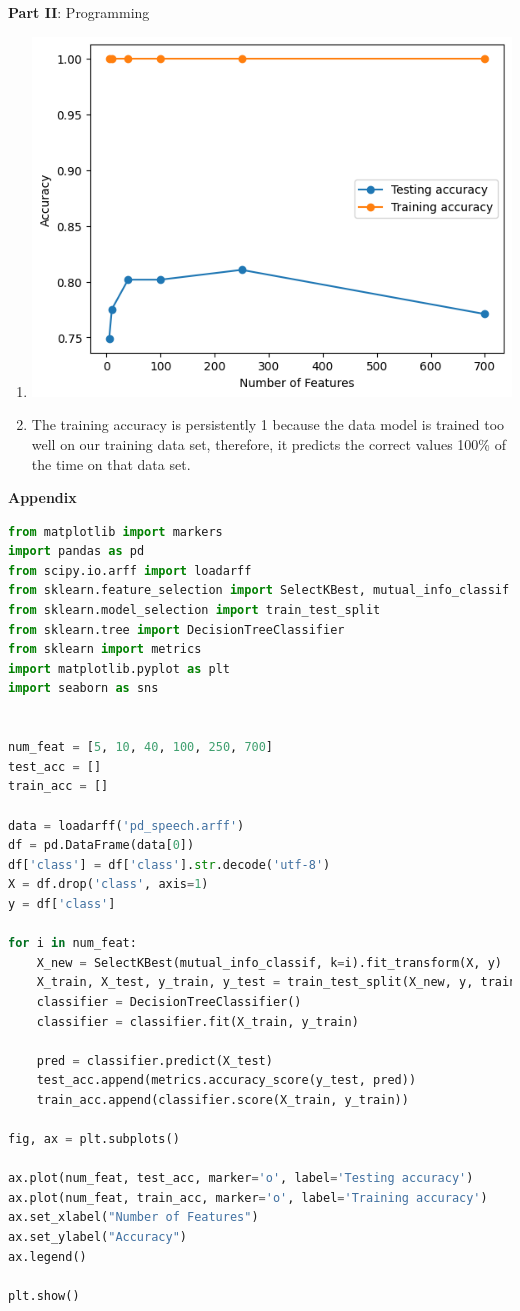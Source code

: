 \documentclass[12pt]{article}
\begin{document}
\center\large{\textbf{Part II}: Programming}

\begin{enumerate}[leftmargin=\labelsep,resume]
\item  \leavevmode\vadjust{\vspace{-\baselineskip}}\newline
\includegraphics{plot}
\item
The training accuracy is persistently 1 because the data model is trained too well on 
our training data set, therefore, it predicts the correct values 100\% of the time on that 
data set.

\end{enumerate}
\newpage
\center\large{\textbf{Appendix}\vskip 0.3cm}

\begin{lstlisting}[language=Python]
from matplotlib import markers
import pandas as pd
from scipy.io.arff import loadarff
from sklearn.feature_selection import SelectKBest, mutual_info_classif
from sklearn.model_selection import train_test_split
from sklearn.tree import DecisionTreeClassifier
from sklearn import metrics
import matplotlib.pyplot as plt
import seaborn as sns


num_feat = [5, 10, 40, 100, 250, 700]
test_acc = []
train_acc = []

data = loadarff('pd_speech.arff')
df = pd.DataFrame(data[0])
df['class'] = df['class'].str.decode('utf-8')
X = df.drop('class', axis=1)
y = df['class']

for i in num_feat:
    X_new = SelectKBest(mutual_info_classif, k=i).fit_transform(X, y)
    X_train, X_test, y_train, y_test = train_test_split(X_new, y, train_size = 0.7,random_state = 1)
    classifier = DecisionTreeClassifier()
    classifier = classifier.fit(X_train, y_train)

    pred = classifier.predict(X_test)
    test_acc.append(metrics.accuracy_score(y_test, pred))
    train_acc.append(classifier.score(X_train, y_train))

fig, ax = plt.subplots()

ax.plot(num_feat, test_acc, marker='o', label='Testing accuracy')
ax.plot(num_feat, train_acc, marker='o', label='Training accuracy')
ax.set_xlabel("Number of Features")
ax.set_ylabel("Accuracy")
ax.legend()

plt.show()
\end{lstlisting}
\end{document}

